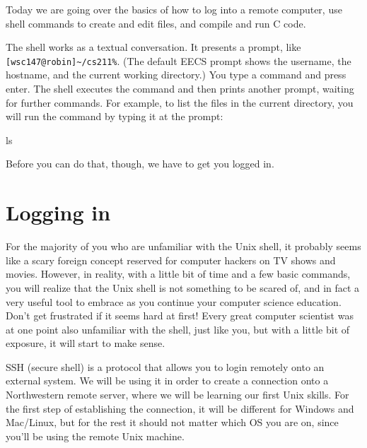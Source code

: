\documentclass{tufte-handout}
\begin{document}
\maketitle

Today we are going over the basics of how to log into a remote computer,
use shell commands to create and edit files, and compile and run C
code.

The shell works as a textual conversation. It presents a prompt, like
\verb![wsc147@robin]~/cs211%!. (The default EECS prompt shows the
username, the hostname, and the current working directory.) You type a
command and press enter. The shell executes the command and then prints
another prompt, waiting for further commands. For example, to list the
files in the current directory, you will run the  command
by typing it at the prompt:

\begin{CmdLine}
  \prompt ls
\end{CmdLine}


\noindent
Before you can do that, though, we have to get you logged in.

\section{Logging in}

For the majority of you who are unfamiliar with the Unix shell, it
probably seems like a scary foreign concept reserved for computer
hackers on TV shows and movies.  However, in reality, with a little bit
of time and a few basic commands, you will realize that the Unix shell
is not something to be scared of, and in fact a very useful tool to
embrace as you continue your computer science education. Don't get
frustrated if it seems hard at first! Every great computer scientist was
at one point also unfamiliar with the shell, just like you, but with a
little bit of exposure, it will start to make sense.

SSH (secure shell) is a protocol that allows you to login remotely onto
an external system. We will be using it in order to create a connection
onto a Northwestern remote server, where we will be learning our first
Unix skills. For the first step of establishing the connection, it will
be different for Windows and Mac/Linux, but for the rest it should not
matter which OS you are on, since you'll be using the remote Unix
machine.
\end{document}
